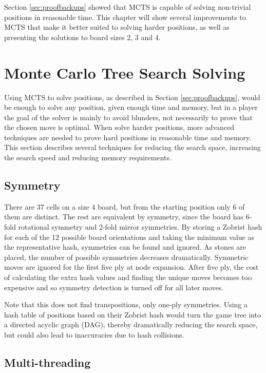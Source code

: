 


Section \ref{sec:proofbackups} showed that MCTS is capable of solving non-trivial positions in reasonable time. This chapter will show several improvements to MCTS that make it better suited to solving harder positions, as well as presenting the solutions to board sizes 2, 3 and 4.


\section{Monte Carlo Tree Search Solving}

Using MCTS to solve positions, as described in Section \ref{sec:proofbackups}, would be enough to solve any position, given enough time and memory, but in a player the goal of the solver is mainly to avoid blunders, not necessarily to prove that the chosen move is optimal. When solve harder positions, more advanced techniques are needed to prove hard positions in reasonable time and memory. This section describes several techniques for reducing the search space, increasing the search speed and reducing memory requirements.


\subsection{Symmetry}

There are 37 cells on a size 4 board, but from the starting position only 6 of them are distinct. The rest are equivalent by symmetry, since the board has 6-fold rotational symmetry and 2-fold mirror symmetries. By storing a Zobrist hash \cite{zobrist1990new} for each of the 12 possible board orientations and taking the minimum value as the representative hash, symmetries can be found and ignored. As stones are placed, the number of possible symmetries decreases dramatically. Symmetric moves are ignored for the first five ply at node expansion. After five ply, the cost of calculating the extra hash values and finding the unique moves becomes too expensive and so symmetry detection is turned off for all later moves.

Note that this does not find transpositions, only one-ply symmetries. Using a hash table of positions based on their Zobrist hash would turn the game tree into a directed acyclic graph (DAG), thereby dramatically reducing the search space, but could also lead to inaccuracies due to hash collisions.

\subsection{Multi-threading}

